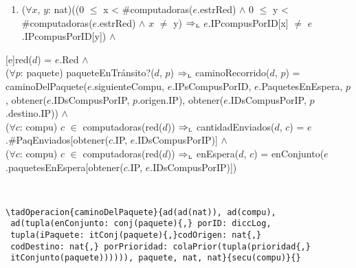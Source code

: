 \begin{Representacion}
{\begin{enumerate}
\item    ($\forall x$, $y$: nat)((0 $\leq$ x < \#computadoras($e$.estrRed) $\land$ 0 $\leq$ y < \#computadoras($e$.estrRed) $\land$ $x$ $\neq$ y) $\Rightarrow_{\mathrm{\scriptscriptstyle{L}}}$ $e$.IPcompusPorID[x] $\neq$ $e$.IPcompusPorID[y]) $\land$ \\


    \end{enumerate} 
    
    }\mbox{} %


[e]{red($d$) = $e$.Red $\land$ \\

  ($\forall p$: paquete) paqueteEnTr\'ansito?($d$, $p$) $\Rightarrow_{\mathrm{\scriptscriptstyle{L}}}$ caminoRecorrido($d$, $p$) = caminoDelPaquete($e$.siguienteCompu, $e$.IPsCompusPorID, $e$.PaquetesEnEspera, $p$, obtener($e$.IDsCompusPorIP, $p$.origen.IP), obtener($e$.IDsCompusPorIP, $p$.destino.IP)) $\land$ \\

  ($\forall c$: compu) $c$ $\in$ computadoras(red($d$)) $\Rightarrow_{\mathrm{\scriptscriptstyle{L}}}$ cantidadEnviados($d$, $c$) = $e$.\#PaqEnviados[obtener($c$.IP, $e$.IDsCompusPorIP)] $\land$ \\

  ($\forall c$: compu) $c$ $\in$ computadoras(red($d$)) $\Rightarrow_{\mathrm{\scriptscriptstyle{L}}}$ enEspera($d$, $c$) = enConjunto($e$.paquetesEnEspera[obtener($c$.IP, $e$.IDsCompusPorIP)])
}

  ~      

\small\begin{verbatim}
\tadOperacion{caminoDelPaquete}{ad(ad(nat)), ad(compu),
 ad(tupla(enConjunto: conj(paquete){,} porID: diccLog, 
 tupla(iPaquete: itConj(paquete){,}codOrigen: nat{,} 
 codDestino: nat{,} porPrioridad: colaPrior(tupla(prioridad{,} 
 itConjunto(paquete)))))), paquete, nat, nat}{secu(compu)}{} 
\end{verbatim}




\end{Representacion}
